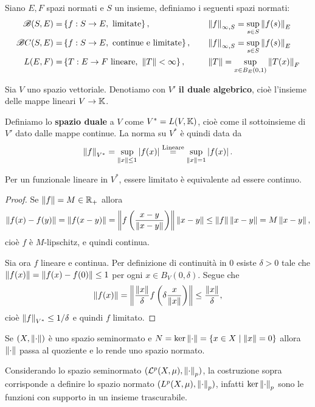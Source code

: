 \begin{definition}
Siano $E,F$ spazi normati e $S$ un insieme, definiamo i seguenti spazi normati:
\begin{align*}
    \Bs(S,E)=&\cpa{f:S\to E,\text{ limitate}},\quad &&\norm{f}_{\infty,S}=\sup_{s\in S}\norm{f(s)}_E\\
    \Bs C(S,E)=&\cpa{f:S\to E,\text{ continue e limitate}},\quad &&\norm{f}_{\infty,S}=\sup_{s\in S}\norm{f(s)}_E\\
    L(E,F)=&\cpa{T:E\to F\text{ lineare, }\norm T<\infty},\quad &&\norm T=\sup_{x\in B_E(0,1)}\norm{T(x)}_F
\end{align*}
\end{definition}

\begin{definition}
Sia $V$ uno spazio vettoriale. Denotiamo con $V'$ \textbf{il duale algebrico}, cio\`e l'insieme delle mappe lineari $V\to \K$. 

Definiamo lo \textbf{spazio duale} a $V$ come $V^\ast=L(V,\K)$, cio\`e come il sottoinsieme di $V'$ dato dalle mappe continue. La norma su $V^\ast$ \`e quindi data da
\[\norm f_{V^\ast}=\sup_{\norm x\leq1}\abs{f(x)}\pasgnl={Lineare}\sup_{\norm x=1}\abs{f(x)}.\]
\end{definition}
\begin{proposition}\label{PrPerFunzionaleLineareLimitatoEquivaleContinuo}
Per un funzionale lineare in $V^\ast$, essere limitato \`e equivalente ad essere continuo.
\end{proposition}
\begin{proof}
Se $\norm f=M\in\R_+$ allora
\[\norm{f(x)-f(y)}=\norm{f(x-y)}=\norm{f\pa{\frac{x-y}{\norm{x-y}}}}\norm{x-y}\leq\norm f\norm{x-y}=M\norm{x-y},\]
cio\`e $f$ \`e $M$-lipschitz, e quindi continua.

Sia ora $f$ lineare e continua. Per definizione di continuit\`a in $0$ esiste $\delta>0$ tale che $\norm {f(x)}=\norm{f(x)-f(0)}\leq 1$ per ogni $x\in B_V(0,\delta)$. Segue che
\[\norm{f(x)}=\norm{\frac{\norm x}\delta f\pa{\delta\frac x{\norm x}}}\leq \frac{\norm x}\delta,\]
cio\`e $\norm f_{V^\ast}\leq 1/\delta$ e quindi $f$ limitato.
\end{proof}


\begin{remark}
Se $(X,\norm\cdot)$ \`e uno spazio seminormato e $N=\ker\norm\cdot=\cpa{x\in X\mid \norm x=0}$ allora $\norm\cdot$ passa al quoziente e lo rende uno spazio normato.
\end{remark}
\begin{example}
    Considerando lo spazio seminormato $(\Lc^p(X,\mu),\normd_p)$, la costruzione sopra corrisponde a definire lo spazio normato $(L^p(X,\mu),\normd_p)$, infatti $\ker \normd_p$ sono le funzioni con supporto in un insieme trascurabile.
\end{example}

